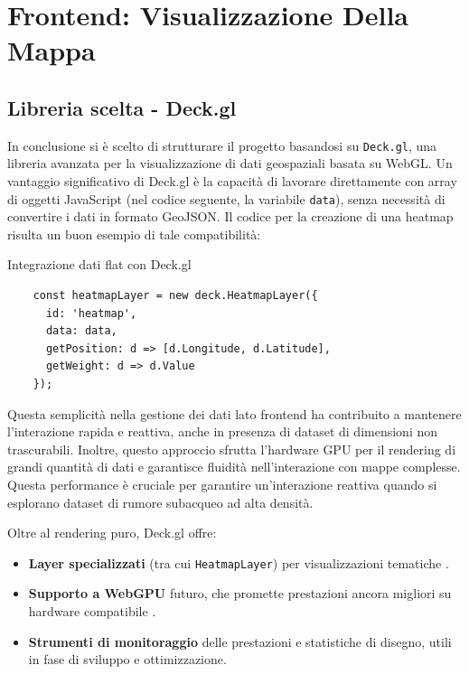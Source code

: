 \section{Frontend: Visualizzazione Della Mappa}
\label{ch:frontend-advanced}

\subsection{Libreria scelta - Deck.gl}

In conclusione si è scelto di strutturare il progetto basandosi su \texttt{Deck.gl}, una libreria avanzata per la visualizzazione di dati geospaziali basata su WebGL. Un vantaggio significativo di Deck.gl è la capacità di lavorare direttamente con array di oggetti JavaScript (nel codice seguente, la variabile \texttt{data}), senza necessità di convertire i dati in formato GeoJSON. \cite{deckgl-heatmap} Il codice per la creazione di una heatmap risulta un buon esempio di tale compatibilità:

\begin{listing}[H]
\caption{Integrazione dati flat con Deck.gl}
\label{lst:deckgl_heatmap_layer} %
\begin{verbatim}
    const heatmapLayer = new deck.HeatmapLayer({
      id: 'heatmap',
      data: data,
      getPosition: d => [d.Longitude, d.Latitude],
      getWeight: d => d.Value
    });
\end{verbatim}
\end{listing}

Questa semplicità nella gestione dei dati lato frontend ha contribuito a mantenere l'interazione rapida e reattiva, anche in presenza di dataset di dimensioni non trascurabili. Inoltre, questo approccio sfrutta l'hardware GPU per il rendering di grandi quantità di dati e garantisce fluidità nell'interazione con mappe complesse. Questa performance è cruciale per garantire un'interazione reattiva quando si esplorano dataset di rumore subacqueo ad alta densità. \cite{deckgl-heatmap}

Oltre al rendering puro, Deck.gl offre:
\begin{itemize}
  \item \textbf{Layer specializzati} (tra cui \texttt{HeatmapLayer}) per visualizzazioni tematiche \cite{deckgl-docs}.
  \item \textbf{Supporto a WebGPU} futuro, che promette prestazioni ancora migliori su hardware compatibile \cite{deckgl-roadmap}.
  \item \textbf{Strumenti di monitoraggio} delle prestazioni e statistiche di disegno, utili in fase di sviluppo e ottimizzazione.
\end{itemize}

